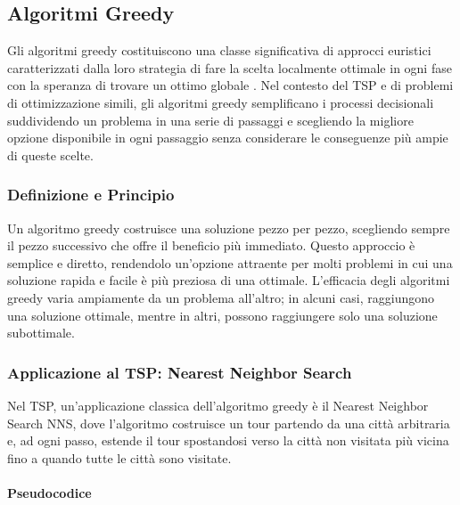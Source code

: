 \subsection{Algoritmi Greedy}

Gli algoritmi greedy costituiscono una classe significativa di approcci euristici caratterizzati dalla loro strategia di fare la scelta localmente ottimale in ogni fase con la speranza di trovare un ottimo globale \cite{Cormen2009}. Nel contesto del \gls{TSP} e di problemi di ottimizzazione simili, gli algoritmi greedy semplificano i processi decisionali suddividendo un problema in una serie di passaggi e scegliendo la migliore opzione disponibile in ogni passaggio senza considerare le conseguenze più ampie di queste scelte\cite{Johnson2002}.

\subsubsection{Definizione e Principio}

Un algoritmo greedy costruisce una soluzione pezzo per pezzo, scegliendo sempre il pezzo successivo che offre il beneficio più immediato\cite{Papadimitriou1998}. Questo approccio è semplice e diretto, rendendolo un'opzione attraente per molti problemi in cui una soluzione rapida e facile è più preziosa di una ottimale. L'efficacia degli algoritmi greedy varia ampiamente da un problema all'altro; in alcuni casi, raggiungono una soluzione ottimale, mentre in altri, possono raggiungere solo una soluzione subottimale\cite{Lawler1985}.

\subsubsection{Applicazione al \gls{TSP}: Nearest Neighbor Search}

Nel \gls{TSP}, un'applicazione classica dell'algoritmo greedy è il Nearest Neighbor Search \gls{NNS}, dove l'algoritmo costruisce un tour partendo da una città arbitraria e, ad ogni passo, estende il tour spostandosi verso la città non visitata più vicina fino a quando tutte le città sono visitate\cite{Gutin2016}.

\paragraph{Pseudocodice}

